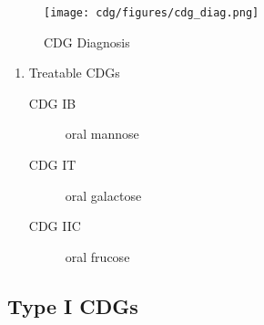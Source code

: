 \documentclass[12pt]{scrartcl}
\begin{document}
\begin{figure}[htbp]
\centering
\texttt{[image: cdg/figures/cdg\_diag.png]}
\caption{\label{fig:orgae3a139}CDG Diagnosis}
\end{figure}

\begin{enumerate}
\item Treatable CDGs
\label{sec:orgd533c0a}
\begin{description}
\item[{CDG IB}] oral mannose
\item[{CDG IT}] oral galactose
\item[{CDG IIC}] oral frucose
\end{description}
\end{enumerate}

\subsection{Type I CDGs}
\label{sec:orga4b5005}
\end{document}

